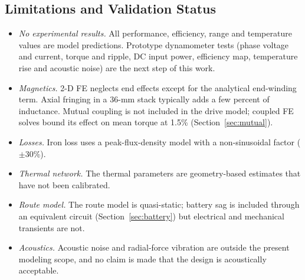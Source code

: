 \documentclass[journal]{IEEEtran}
\begin{document}
\subsection{Limitations and Validation Status}
\label{sec:limits}
\begin{itemize}
\item \emph{No experimental results.} All performance, efficiency, range and
temperature values are model predictions. Prototype dynamometer tests (phase
voltage and current, torque and ripple, DC input power, efficiency map,
temperature rise and acoustic noise) are the next step of this work.
\item \emph{Magnetics.} 2-D FE neglects end effects except for the analytical
end-winding term. Axial fringing in a 36-mm stack typically adds a few percent
of inductance. Mutual coupling is not included in the drive model; coupled FE solves bound
its effect on mean torque at 1.5\% (Section~\ref{sec:mutual}).
\item \emph{Losses.} Iron loss uses a peak-flux-density model with a
non-sinusoidal factor ($\pm$30\%).
\item \emph{Thermal network.} The thermal parameters are geometry-based
estimates that have not been calibrated.
\item \emph{Route model.} The route model is quasi-static; battery sag is
included through an equivalent circuit (Section~\ref{sec:battery}) but
electrical and mechanical transients are not.
\item \emph{Acoustics.} Acoustic noise and radial-force vibration are outside
the present modeling scope, and no claim is made that the design is
acoustically acceptable.
\end{itemize}
\end{document}
